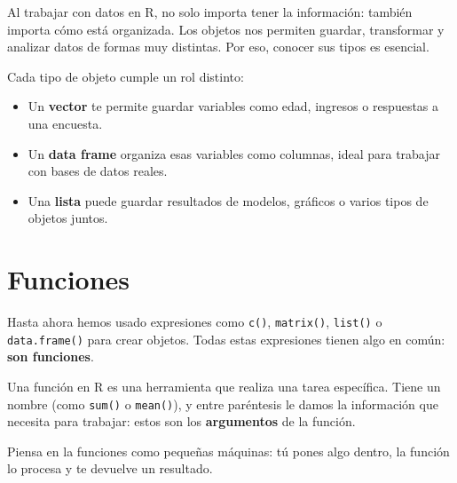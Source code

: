 \documentclass[
  letterpaper,
  DIV=11,
  numbers=noendperiod,
  twoside]{scrreprt}
\begin{document}
Al trabajar con datos en R, no solo importa tener la información:
también importa cómo está organizada. Los objetos nos permiten guardar,
transformar y analizar datos de formas muy distintas. Por eso, conocer
sus tipos es esencial.

\begin{tcolorbox}[enhanced jigsaw, titlerule=0mm, title=\textcolor{quarto-callout-note-color}{\faInfo}\hspace{0.5em}{Dato}, colback=white, opacityback=0, breakable, toprule=.15mm, left=2mm, leftrule=.75mm, colframe=quarto-callout-note-color-frame, bottomtitle=1mm, rightrule=.15mm, opacitybacktitle=0.6, coltitle=black, arc=.35mm, bottomrule=.15mm, toptitle=1mm, colbacktitle=quarto-callout-note-color!10!white]

Cada tipo de objeto cumple un rol distinto:

\begin{itemize}
\item
  Un \textbf{vector} te permite guardar variables como edad, ingresos o
  respuestas a una encuesta.
\item
  Un \textbf{data frame} organiza esas variables como columnas, ideal
  para trabajar con bases de datos reales.
\item
  Una \textbf{lista} puede guardar resultados de modelos, gráficos o
  varios tipos de objetos juntos.
\end{itemize}

\end{tcolorbox}

\chapter{Funciones}\label{funciones}

Hasta ahora hemos usado expresiones como \texttt{c()},
\texttt{matrix()}, \texttt{list()} o \texttt{data.frame()} para crear
objetos. Todas estas expresiones tienen algo en común: \textbf{son
funciones}.

Una función en R es una herramienta que realiza una tarea específica.
Tiene un nombre (como \texttt{sum()} o \texttt{mean()}), y entre
paréntesis le damos la información que necesita para trabajar: estos son
los \textbf{argumentos} de la función.

Piensa en la funciones como pequeñas máquinas: tú pones algo dentro, la
función lo procesa y te devuelve un resultado.
\end{document}
